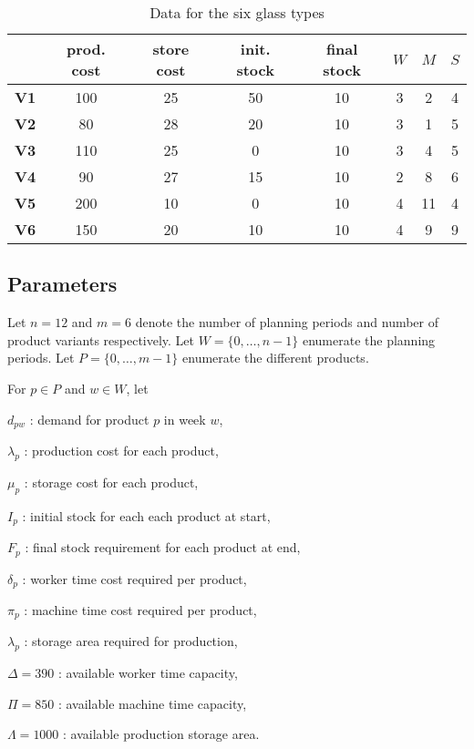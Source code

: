 \documentclass[11pt,oneside]{article}
\begin{document}
\begin{table}[h]
    \center
    \caption{Data for the six glass types}
    \begin{tabular}{cccccccc}
        \hline
        & prod. cost & store cost & init. stock & final stock & $W$ & $M$ & $S$ \\
        \hline
        \textbf{V1} & 100 & 25 & 50 & 10 & 3 & 2 & 4 \\
        \textbf{V2} & 80 & 28 & 20 & 10 & 3 & 1 & 5 \\
        \textbf{V3} & 110 & 25 & 0 & 10 & 3 & 4 & 5 \\
        \textbf{V4} & 90 & 27 & 15 & 10 & 2 & 8 & 6 \\
        \textbf{V5} & 200 & 10 & 0 & 10 & 4 & 11 & 4 \\
        \textbf{V6} & 150 & 20 & 10 & 10 & 4 & 9 & 9 \\
        \hline
    \end{tabular}
\end{table}

\subsection{Parameters}

Let $n=12$ and $m=6$ denote the number of planning periods and number of product
variants respectively. Let $W=\lbrace 0,\ldots,n-1\rbrace$ enumerate the planning
periods. Let $P=\lbrace 0,\ldots, m-1\rbrace$ enumerate the different products.

For $p\in P$ and $w\in W$, let

$d_{pw}$ : demand for product $p$ in week $w$,

$\lambda_{p}$ : production cost for each product,

$\mu_{p}$ : storage cost for each product,

$I_{p}$ : initial stock for each each product at start,

$F_{p}$ : final stock requirement for each product at end,

$\delta_p$ : worker time cost required per product,

$\pi_p$ : machine time cost required per product,

$\lambda_p$ : storage area required for production,

$\Delta = 390$ : available worker time capacity,

$\Pi = 850$ : available machine time capacity,

$\Lambda = 1000$ : available production storage area.
\end{document}
